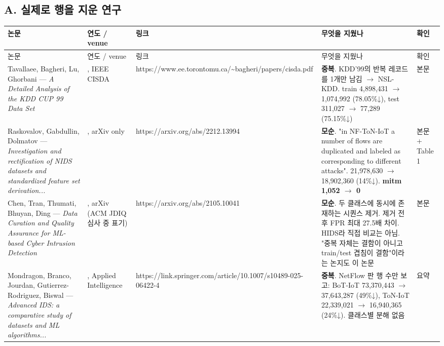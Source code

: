 \subsection{A. 실제로 행을 지운 연구}
\begingroup
\footnotesize
\begin{longtable}{>{\raggedright\arraybackslash}p{}>{\raggedright\arraybackslash}p{}>{\raggedright\arraybackslash}p{}>{\raggedright\arraybackslash}p{}>{\raggedright\arraybackslash}p{}}
\toprule
논문 & 연도 /\allowbreak{} venue & 링크 & 무엇을 지웠나 & 확인 \\ \midrule
\endfirsthead
논문 & 연도 /\allowbreak{} venue & 링크 & 무엇을 지웠나 & 확인 \\ \midrule
\endhead
{}Tavallaee, Bagheri, Lu, Ghorbani — \emph{A Detailed Analysis of the KDD CUP 99 Data Set} & 2009, IEEE CISDA & https:/\allowbreak{}/\allowbreak{}www.ee.torontomu.ca/\allowbreak{}\textasciitilde{}bagheri/\allowbreak{}papers/\allowbreak{}cisda.pdf & \textbf{중복}. KDD'99의 반복 레코드를 1개만 남김  \ensuremath{\rightarrow}  NSL-KDD. train 4,898,431  \ensuremath{\rightarrow}  1,074,992 (78.05\%↓), test 311,027  \ensuremath{\rightarrow}  77,289 (75.15\%↓) & 본문 \\
{}Raskovalov, Gabdullin, Dolmatov — \emph{Investigation and rectification of NIDS datasets and standardized feature set derivation...} & 2022, arXiv only & https:/\allowbreak{}/\allowbreak{}arxiv.org/\allowbreak{}abs/\allowbreak{}2212.13994 & \textbf{모순}. "in NF-ToN-IoT a number of flows are duplicated and labeled as corresponding to different attacks". 21,978,630  \ensuremath{\rightarrow}  18,902,360 (14\%↓). \textbf{mitm 1,052  \ensuremath{\rightarrow}  0} & 본문 +\allowbreak{} Table 1 \\
{}Chen, Tran, Thumati, Bhuyan, Ding — \emph{Data Curation and Quality Assurance for ML-based Cyber Intrusion Detection} & 2021, arXiv (ACM JDIQ 심사 중 표기) & https:/\allowbreak{}/\allowbreak{}arxiv.org/\allowbreak{}abs/\allowbreak{}2105.10041 & \textbf{모순}. 두 클래스에 동시에 존재하는 시퀀스 제거. 제거 전후 FPR 최대 27.5배 차이. HIDS라 직접 비교는 아님. "중복 자체는 결함이 아니고 train/\allowbreak{}test 겹침이 결함"이라는 논지도 이 논문 & 본문 \\
{}Mondragon, Branco, Jourdan, Gutierrez-Rodriguez, Biswal — \emph{Advanced IDS: a comparative study of datasets and ML algorithms...} & 2025, Applied Intelligence & https:/\allowbreak{}/\allowbreak{}link.springer.com/\allowbreak{}article/\allowbreak{}10.1007/\allowbreak{}s10489-025-06422-4 & \textbf{중복}. NetFlow 판 행 수만 보고: BoT-IoT 73,370,443  \ensuremath{\rightarrow}  37,643,287 (49\%↓), ToN-IoT 22,339,021  \ensuremath{\rightarrow}  16,940,365 (24\%↓). 클래스별 분해 없음 & 요약 \\
\bottomrule
\end{longtable}
\endgroup
